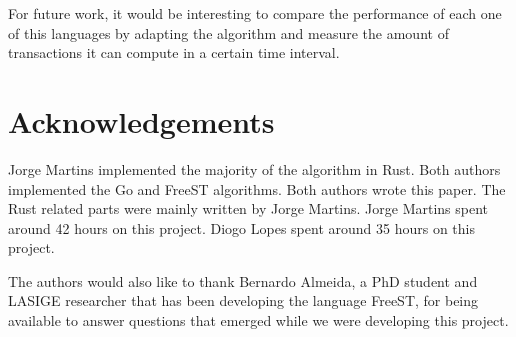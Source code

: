 \documentclass[runningheads]{llncs}
\begin{document}
For future work, it would be interesting to compare the performance of each one of this languages by adapting the algorithm and measure the amount of transactions it can compute in a certain time interval.
\section*{Acknowledgements}
Jorge Martins implemented the majority of the algorithm in Rust. Both authors implemented the Go and FreeST algorithms.
Both authors wrote this paper. The Rust related parts were mainly written by Jorge Martins.
Jorge Martins spent around 42 hours on this project. Diogo Lopes spent around 35 hours on this project.

The authors would also like to thank Bernardo Almeida, a PhD student and LASIGE researcher that has been developing the language FreeST, for being available to answer questions that emerged while we were developing this project.


\end{document}
